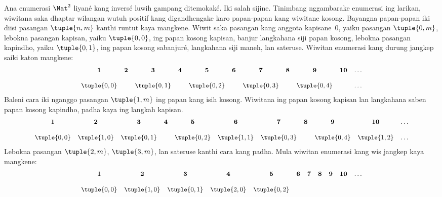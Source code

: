 \documentclass[../../../include/open-logic-section]{subfiles}
\begin{document}


\begin{explain}
Ana enumerasi $\Nat^2$ liyané kang inversé luwih gampang ditemokaké.
Iki salah sijine. Tinimbang nggambarake enumerasi ing larikan,
wiwitana saka dhaptar wilangan wutuh positif kang digandhengake karo
papan-papan kang wiwitane kosong. Bayangna papan-papan iki diisi
pasangan $\tuple{n,m}$ kanthi runtut kaya mangkene.
Wiwit saka pasangan kang anggota kapisane~$0$, yaiku pasangan
$\tuple{0,m}$, lebokna pasangan kapisan, yaiku $\tuple{0,0}$, ing papan
kosong kapisan, banjur langkahana siji papan kosong, lebokna pasangan kapindho,
yaiku $\tuple{0,1}$, ing papan kosong sabanjuré, langkahana siji maneh,
lan sateruse. Wiwitan enumerasi kang durung jangkep saiki katon mangkene:
\[\small
\begin{array}{@{}c c c c c c c c c c c@{}}
\mathbf 1 & \mathbf 2 & \mathbf 3 & \mathbf 4 & \mathbf 5 & \mathbf 6 & \mathbf 7 & \mathbf 8 & \mathbf 9 & \mathbf{10} & \dots \\ \\
\tuple{0,0} &  & \tuple{0,1} &  & \tuple{0,2} &  & \tuple{0,3} & & \tuple{0,4} &  & \dots \\
\end{array}
\]
Baleni cara iki nganggo pasangan $\tuple{1,m}$ ing papan kang isih
kosong. Wiwitana ing papan kosong kapisan lan langkahana saben papan
kosong kapindho, padha kaya ing langkah kapisan.
\[\small
\begin{array}{@{}c c c c c c c c c c c@{}}
\mathbf 1 & \mathbf 2 & \mathbf 3 & \mathbf 4 & \mathbf 5 & \mathbf 6 & \mathbf 7 & \mathbf 8 & \mathbf 9 & \mathbf{10} & \dots \\ \\
\tuple{0,0} & \tuple{1,0} & \tuple{0,1} &  & \tuple{0,2} & \tuple{1,1} &
\tuple{0,3} & & \tuple{0,4} &  \tuple{1,2} & \dots \\
\end{array}
\]
Lebokna pasangan $\tuple{2,m}$, $\tuple{3,m}$, lan sateruse kanthi cara kang padha.
Mula wiwitan enumerasi kang wis jangkep kaya mangkene:
\[\small
\begin{array}{@{}cc c c c c c c c c c@{}}
\mathbf 1 & \mathbf 2 & \mathbf 3 & \mathbf 4 & \mathbf 5 & \mathbf 6 & \mathbf 7 & \mathbf 8 & \mathbf 9 & \mathbf{10} & \dots \\ \\
\tuple{0,0} & \tuple{1,0} & \tuple{0,1} & \tuple{2,0}  & \tuple{0,2} &

\end{array}\]
\end{explain}
\end{document}
